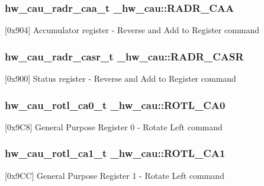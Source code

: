 \subsubsection[{\texorpdfstring{R\+A\+D\+R\+\_\+\+C\+AA}{RADR_CAA}}]{ {\bf hw\+\_\+cau\+\_\+radr\+\_\+caa\+\_\+t} \+\_\+hw\+\_\+cau\+::\+R\+A\+D\+R\+\_\+\+C\+AA}\hypertarget{struct__hw__cau_a3601e709fae72e1d1d7dbfc1be34e594}{}\label{struct__hw__cau_a3601e709fae72e1d1d7dbfc1be34e594}
\mbox{[}0x904\mbox{]} Accumulator register -\/ Reverse and Add to Register command 
\subsubsection[{\texorpdfstring{R\+A\+D\+R\+\_\+\+C\+A\+SR}{RADR_CASR}}]{ {\bf hw\+\_\+cau\+\_\+radr\+\_\+casr\+\_\+t} \+\_\+hw\+\_\+cau\+::\+R\+A\+D\+R\+\_\+\+C\+A\+SR}\hypertarget{struct__hw__cau_a8310931408380fe75a6d39e2940c967f}{}\label{struct__hw__cau_a8310931408380fe75a6d39e2940c967f}
\mbox{[}0x900\mbox{]} Status register -\/ Reverse and Add to Register command 
\subsubsection[{\texorpdfstring{R\+O\+T\+L\+\_\+\+C\+A0}{ROTL_CA0}}]{ {\bf hw\+\_\+cau\+\_\+rotl\+\_\+ca0\+\_\+t} \+\_\+hw\+\_\+cau\+::\+R\+O\+T\+L\+\_\+\+C\+A0}\hypertarget{struct__hw__cau_a0ce142eda9819092aca68c23b162509b}{}\label{struct__hw__cau_a0ce142eda9819092aca68c23b162509b}
\mbox{[}0x9\+C8\mbox{]} General Purpose Register 0 -\/ Rotate Left command 
\subsubsection[{\texorpdfstring{R\+O\+T\+L\+\_\+\+C\+A1}{ROTL_CA1}}]{ {\bf hw\+\_\+cau\+\_\+rotl\+\_\+ca1\+\_\+t} \+\_\+hw\+\_\+cau\+::\+R\+O\+T\+L\+\_\+\+C\+A1}\hypertarget{struct__hw__cau_a71978550b899cfd1a93b95149dee98a4}{}\label{struct__hw__cau_a71978550b899cfd1a93b95149dee98a4}
\mbox{[}0x9\+CC\mbox{]} General Purpose Register 1 -\/ Rotate Left command 
